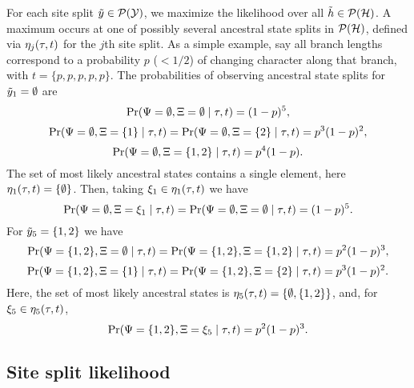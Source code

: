 For each site split $\tilde{y}\in\mathcal{P}(\mathcal{Y})$, we maximize the likelihood over all $\tilde{h}\in\mathcal{P}(\mathcal{H})$.
A maximum occurs at one of possibly several ancestral state splits in $\mathcal{P}(\mathcal{H})$, defined via $\eta_j(\tau, t)$ for the $j$th site split.
As a simple example, say all branch lengths correspond to a probability $p$ ($< 1/2$) of changing character along that branch, with $t=\{p,p,p,p,p\}$.
The probabilities of observing ancestral state splits for $\tilde{y}_1=\emptyset$ are
\[
\Pr(\Psi=\emptyset, \Xi=\emptyset \mid \tau, t) =
(1-p)^5,
\]
\[
\Pr(\Psi=\emptyset, \Xi=\{1\} \mid \tau, t) =
\Pr(\Psi=\emptyset, \Xi=\{2\} \mid \tau, t) =
p^3(1-p)^2,
\]
\[
\Pr(\Psi=\emptyset, \Xi=\{1,2\} \mid \tau, t) =
p^4(1-p).
\]
The set of most likely ancestral states contains a single element, here $\eta_1(\tau, t)=\{\emptyset\}$.
Then, taking $\xi_1\in\eta_1(\tau, t)$ we have
\[
\Pr(\Psi=\emptyset, \Xi=\xi_1 \mid \tau, t) =
\Pr(\Psi=\emptyset, \Xi=\emptyset \mid \tau, t) =
(1-p)^5.
\]
For $\tilde{y}_5=\{1,2\}$ we have
\[
\Pr(\Psi=\{1,2\}, \Xi=\emptyset \mid \tau, t) =
\Pr(\Psi=\{1,2\}, \Xi=\{1,2\} \mid \tau, t) =
p^2(1-p)^3,
\]
\[
\Pr(\Psi=\{1,2\}, \Xi=\{1\} \mid \tau, t) =
\Pr(\Psi=\{1,2\}, \Xi=\{2\} \mid \tau, t) =
p^3(1-p)^2.
\]
Here, the set of most likely ancestral states is $\eta_5(\tau, t)=\{\emptyset,\{1,2\}\}$, and, for $\xi_5\in\eta_5(\tau, t)$,
\[
\Pr(\Psi=\{1,2\}, \Xi=\xi_5 \mid \tau, t) =
p^2(1-p)^3.
\]

\subsection*{Site split likelihood}

